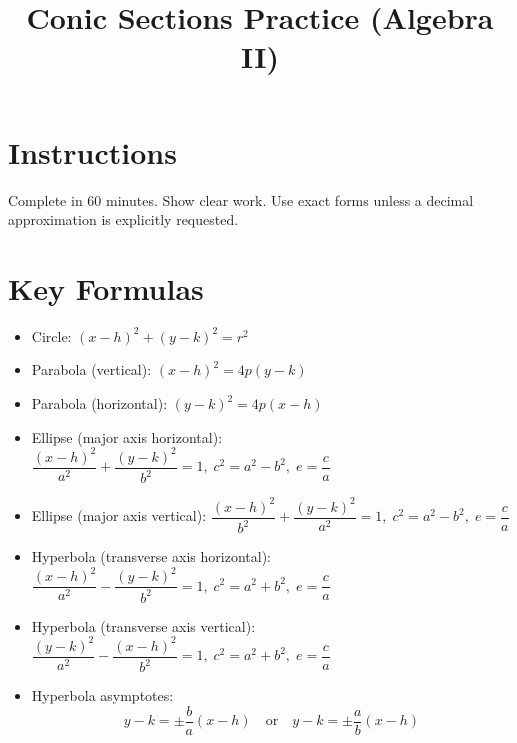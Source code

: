 \documentclass[12pt]{article}
\title{Conic Sections Practice (Algebra II)}
\author{}
\date{}
\begin{document}
\maketitle

\section*{Instructions}
Complete in 60 minutes. Show clear work. Use exact forms unless a decimal approximation is explicitly requested.

\section*{Key Formulas}
\begin{itemize}
  \item Circle: $(x-h)^2+(y-k)^2=r^2$
  \item Parabola (vertical): $(x-h)^2=4p(y-k)$
  \item Parabola (horizontal): $(y-k)^2=4p(x-h)$
  \item Ellipse (major axis horizontal): $\dfrac{(x-h)^2}{a^2}+\dfrac{(y-k)^2}{b^2}=1,\; c^2=a^2-b^2,\; e=\dfrac{c}{a}$
  \item Ellipse (major axis vertical): $\dfrac{(x-h)^2}{b^2}+\dfrac{(y-k)^2}{a^2}=1,\; c^2=a^2-b^2,\; e=\dfrac{c}{a}$
  \item Hyperbola (transverse axis horizontal): $\dfrac{(x-h)^2}{a^2}-\dfrac{(y-k)^2}{b^2}=1,\; c^2=a^2+b^2,\; e=\dfrac{c}{a}$
  \item Hyperbola (transverse axis vertical): $\dfrac{(y-k)^2}{a^2}-\dfrac{(x-h)^2}{b^2}=1,\; c^2=a^2+b^2,\; e=\dfrac{c}{a}$
  \item Hyperbola asymptotes:
  \[
  y-k=\pm \frac{b}{a}(x-h)\quad \text{or} \quad y-k=\pm \frac{a}{b}(x-h)
  \]
\end{itemize}
\end{document}
